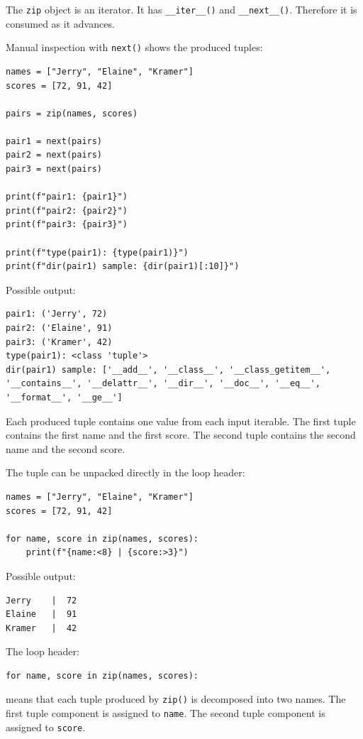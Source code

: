The \texttt{zip} object is an iterator. It has \texttt{\_\_iter\_\_()} and \texttt{\_\_next\_\_()}. Therefore it is consumed as it advances.

Manual inspection with \texttt{next()} shows the produced tuples:

\begin{verbatim}
names = ["Jerry", "Elaine", "Kramer"]
scores = [72, 91, 42]

pairs = zip(names, scores)

pair1 = next(pairs)
pair2 = next(pairs)
pair3 = next(pairs)

print(f"pair1: {pair1}")
print(f"pair2: {pair2}")
print(f"pair3: {pair3}")

print(f"type(pair1): {type(pair1)}")
print(f"dir(pair1) sample: {dir(pair1)[:10]}")
\end{verbatim}

Possible output:

\begin{verbatim}
pair1: ('Jerry', 72)
pair2: ('Elaine', 91)
pair3: ('Kramer', 42)
type(pair1): <class 'tuple'>
dir(pair1) sample: ['__add__', '__class__', '__class_getitem__',
'__contains__', '__delattr__', '__dir__', '__doc__', '__eq__',
'__format__', '__ge__']
\end{verbatim}

Each produced tuple contains one value from each input iterable. The first tuple contains the first name and the first score. The second tuple contains the second name and the second score.

The tuple can be unpacked directly in the loop header:

\begin{verbatim}
names = ["Jerry", "Elaine", "Kramer"]
scores = [72, 91, 42]

for name, score in zip(names, scores):
    print(f"{name:<8} | {score:>3}")
\end{verbatim}

Possible output:

\begin{verbatim}
Jerry    |  72
Elaine   |  91
Kramer   |  42
\end{verbatim}

The loop header:

\begin{verbatim}
for name, score in zip(names, scores):
\end{verbatim}

means that each tuple produced by \texttt{zip()} is decomposed into two names. The first tuple component is assigned to \texttt{name}. The second tuple component is assigned to \texttt{score}.

